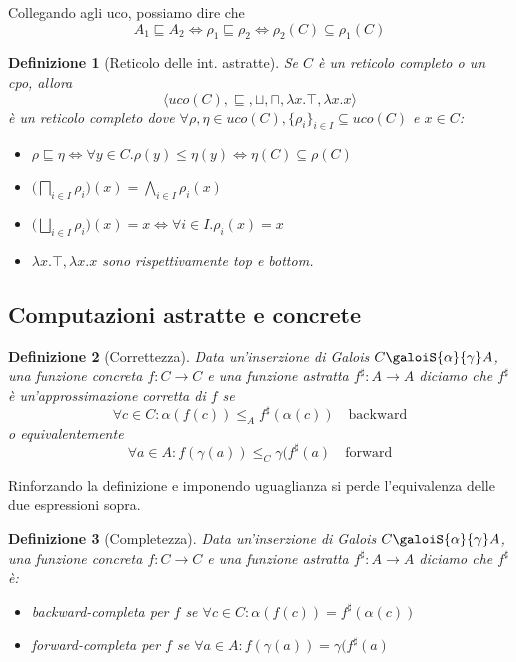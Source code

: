 \documentclass[a4paper, 10pt]{article}
\newtheorem{definit}{Definizione}[subsection]
\begin{document}
	Collegando agli uco, possiamo dire che \[ A_1 \sqsubseteq A_2 \Leftrightarrow \rho_1 \sqsubseteq \rho_2 \Leftrightarrow \rho_2(C) \subseteq \rho_1(C) \]
	
	\begin{definit}[Reticolo delle int. astratte]
		Se $C$ è un reticolo completo o un cpo, allora \[ \langle uco(C), \sqsubseteq, \sqcup, \sqcap, \lambda x.\top, \lambda x.x \rangle \] è un reticolo completo dove $\forall \rho, \eta \in uco(C), \{ \rho_i \}_{i \in I} \subseteq uco(C)$ e $x \in C$:\begin{itemize}
			\item $\rho \sqsubseteq \eta \Leftrightarrow \forall y \in C.\rho(y) \leq \eta(y) \Leftrightarrow \eta(C) \subseteq \rho(C)$
			
			\item $ \displaystyle \Big( \bigsqcap_{i \in I} \rho_i \Big)(x) = \bigwedge_{i \in I} \rho_i(x)$
			
			\item $ \displaystyle \Big( \bigsqcup_{i \in I} \rho_i \Big)(x) = x \Leftrightarrow \forall i \in I. \rho_i(x)=x$
			
			\item $\lambda x.\top, \lambda x.x$ sono rispettivamente top e bottom. 
		\end{itemize}
	\end{definit}

	\subsection{Computazioni astratte e concrete}
	\begin{definit}[Correttezza]
		Data un'inserzione di Galois $C \galoiS{\alpha}{\gamma} A$, una funzione concreta $f: C \to C$ e una funzione astratta $f^\sharp: A \to A$ diciamo che $f^\sharp$ è un'approssimazione corretta di $f$ se \[ \forall c \in C: \alpha(f(c)) \leq_A f^\sharp(\alpha(c)) \quad \text{backward} \] o equivalentemente \[ \forall a \in A: f(\gamma(a)) \leq_C \gamma(f^\sharp(a) \quad \text{forward} \]
	\end{definit}
	
	Rinforzando la definizione e imponendo uguaglianza si perde l'equivalenza delle due espressioni sopra. 
	\begin{definit}[Completezza]
		Data un'inserzione di Galois $C \galoiS{\alpha}{\gamma} A$, una funzione concreta $f: C \to C$ e una funzione astratta $f^\sharp: A \to A$ diciamo che $f^\sharp$ è: \begin{itemize}
			\item backward-completa per $f$ se  $\forall c \in C: \alpha(f(c)) = f^\sharp(\alpha(c))$
			\item forward-completa per $f$ se $\forall a \in A: f(\gamma(a)) = \gamma(f^\sharp(a)$
		\end{itemize}
	\end{definit}
	
\end{document}

